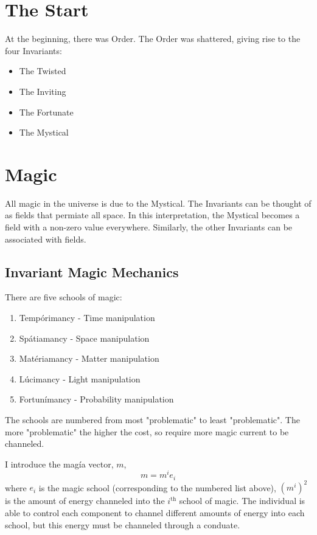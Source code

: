 \documentclass[
a4paper,
10pt,
twoside,
prd,
aps,
nofootinbib,
superscriptaddress,
floatfix,
preprintnumbers,
]{article}
\begin{document}
\titleinf
\maketitle
\startmcols

\section{The Start}

At the beginning, there was Order.
The Order was shattered, giving rise to the four Invariants:
\begin{itemize}
	\item The Twisted
	\item The Inviting
	\item The Fortunate
	\item The Mystical
\end{itemize}

\section{Magic}

All magic in the universe is due to the Mystical.
The Invariants can be thought of as fields that permiate all space.
In this interpretation, the Mystical becomes a field with a non-zero value everywhere.
Similarly, the other Invariants can be associated with fields.

\subsection{Invariant Magic Mechanics}

There are five schools of magic:
\begin{enumerate}
	\item Tempórimancy - Time manipulation
	\item Spátiamancy - Space manipulation
	\item Matériamancy - Matter manipulation
	\item Lúcimancy - Light manipulation
	\item Fortunímancy - Probability manipulation
\end{enumerate}

The schools are numbered from most "problematic" to least "problematic".
The more "problematic" the higher the cost, so require more magic current to be channeled.

I introduce the magía vector, $m$,
\begin{equation}
	m = m^i e_i
	\label{eq : magic vector}
\end{equation}
where $e_i$ is the magic school (corresponding to the numbered list above), $(m^i)^2$ is the amount of energy channeled into the $i^{\text{th}}$ school of magic.
The individual is able to control each component to channel different amounts of energy into each school, but this energy must be channeled through a conduate.
\end{document}
